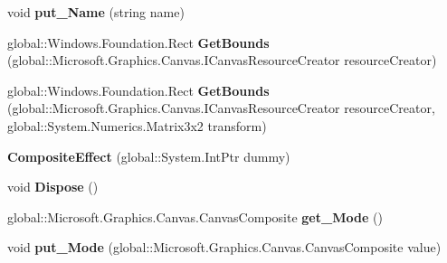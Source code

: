 \begin{DoxyCompactItemize}
void {\bfseries put\+\_\+\+Name} (string name)
\item 
\mbox{\label{class_microsoft_1_1_graphics_1_1_canvas_1_1_effects_1_1_composite_effect_a991680e8a31e88420dd24001b74e229e}} 
global\+::\+Windows.\+Foundation.\+Rect {\bfseries Get\+Bounds} (global\+::\+Microsoft.\+Graphics.\+Canvas.\+I\+Canvas\+Resource\+Creator resource\+Creator)
\item 
\mbox{\label{class_microsoft_1_1_graphics_1_1_canvas_1_1_effects_1_1_composite_effect_a403028b263af314b1162888a2320783e}} 
global\+::\+Windows.\+Foundation.\+Rect {\bfseries Get\+Bounds} (global\+::\+Microsoft.\+Graphics.\+Canvas.\+I\+Canvas\+Resource\+Creator resource\+Creator, global\+::\+System.\+Numerics.\+Matrix3x2 transform)
\item 
\mbox{\label{class_microsoft_1_1_graphics_1_1_canvas_1_1_effects_1_1_composite_effect_a32c62338e5b874000e491bacc0e032c1}} 
{\bfseries Composite\+Effect} (global\+::\+System.\+Int\+Ptr dummy)
\item 
\mbox{\label{class_microsoft_1_1_graphics_1_1_canvas_1_1_effects_1_1_composite_effect_a575ed0bb91f8f9057d8c3afe03a121e5}} 
void {\bfseries Dispose} ()
\item 
\mbox{\label{class_microsoft_1_1_graphics_1_1_canvas_1_1_effects_1_1_composite_effect_a0dfe9fcf616917956fcad2cd37bb9866}} 
global\+::\+Microsoft.\+Graphics.\+Canvas.\+Canvas\+Composite {\bfseries get\+\_\+\+Mode} ()
\item 
\mbox{\label{class_microsoft_1_1_graphics_1_1_canvas_1_1_effects_1_1_composite_effect_ae7ce16aff8d9ed99b8886bff661b4e20}} 
void {\bfseries put\+\_\+\+Mode} (global\+::\+Microsoft.\+Graphics.\+Canvas.\+Canvas\+Composite value)
\item 
\mbox{\label{class_microsoft_1_1_graphics_1_1_canvas_1_1_effects_1_1_composite_effect_a8478bf885b21b246f10dc2bf0558e37c}} 

\end{DoxyCompactItemize}
